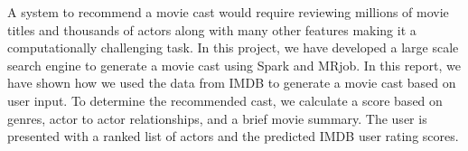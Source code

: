 A system to recommend a movie cast would require reviewing millions of movie titles and thousands of actors along with many other features making it a computationally challenging task. In this project, we have developed a large scale search engine to generate a movie cast using Spark and MRjob. In this report, we have shown how we used the data from IMDB\cite{IMDb} to generate a movie cast based on user input. To determine the recommended cast, we calculate a score based on genres, actor to actor relationships, and a brief movie summary. The user is presented with a ranked list of actors and the predicted IMDB user rating scores.